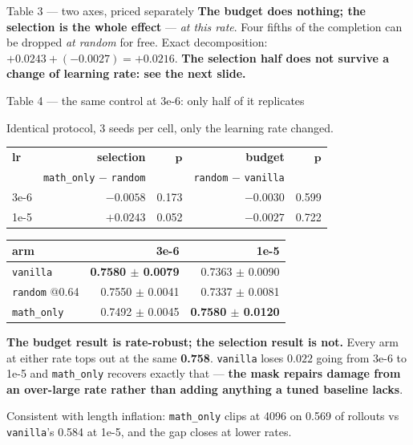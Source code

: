 \documentclass[aspectratio=169,11pt]{beamer}
\newcommand{\up}[1]{\textcolor{good}{\textbf{#1}}}
\newcommand{\dn}[1]{\textcolor{bad}{\textbf{#1}}}
\newcommand{\aside}[1]{{\footnotesize\textcolor{mut}{#1}}}
\begin{document}
\begin{frame}{Table 3 --- two axes, priced separately}
\vspace{0.5em}
\textbf{The budget does nothing; the selection is the whole effect} --- \emph{at this rate}.
Four fifths of the completion can be dropped \emph{at random} for free. Exact decomposition:
$+0.0243+(-0.0027)=+0.0216$. \dn{The selection half does not survive a change of learning
rate: see the next slide.}

\end{frame}

\begin{frame}{Table 4 --- the same control at 3e-6: only half of it replicates}

\aside{Identical protocol, 3 seeds per cell, only the learning rate changed.}

\vspace{0.9em}
\centering
{\small
\begin{tabular}{@{}lrrrr@{}}
\toprule
\textbf{lr} & \textbf{selection} & $\boldsymbol{p}$ & \textbf{budget} & $\boldsymbol{p}$ \\
 & \aside{\texttt{math\_only} $-$ \texttt{random}} & & \aside{\texttt{random} $-$ \texttt{vanilla}} & \\
\midrule
3e-6 & \dn{$-0.0058$} & 0.173 & $-0.0030$ & 0.599 \\
1e-5 & \up{$+0.0243$} & 0.052 & $-0.0027$ & 0.722 \\
\bottomrule
\end{tabular}}

\vspace{0.9em}
{\small
\begin{tabular}{@{}lrr@{}}
\toprule
\textbf{arm} & \textbf{3e-6} & \textbf{1e-5} \\
\midrule
\texttt{vanilla}      & \up{0.7580 $\pm$ 0.0079} & 0.7363 $\pm$ 0.0090 \\
\texttt{random} @0.64 & 0.7550 $\pm$ 0.0041      & 0.7337 $\pm$ 0.0081 \\
\texttt{math\_only}   & 0.7492 $\pm$ 0.0045      & \up{0.7580 $\pm$ 0.0120} \\
\bottomrule
\end{tabular}}

\flushleft
\vspace{0.8em}
\textbf{The budget result is rate-robust; the selection result is not.} Every arm at either
rate tops out at the same \textbf{0.758}. \texttt{vanilla} loses $0.022$ going from 3e-6 to
1e-5 and \texttt{math\_only} recovers exactly that --- \textbf{the mask repairs damage from an
over-large rate rather than adding anything a tuned baseline lacks}.

\medskip
\aside{Consistent with length inflation: \texttt{math\_only} clips at 4096 on 0.569 of rollouts
vs \texttt{vanilla}'s 0.584 at 1e-5, and the gap closes at lower rates.}

\end{frame}
\end{document}
